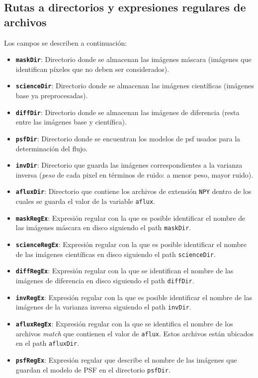 \begin{appendix}
\section{Rutas a directorios y expresiones regulares de archivos}
\label{subs:des_rutas}
Los campos se describen a continuaci\'on:
\begin{itemize}
\item \textbf{\texttt{maskDir}}: Directorio donde se almacenan las im\'agenes m\'ascara (im\'agenes que identifican p\'ixeles que no deben ser considerados).
\item \textbf{\texttt{scienceDir}}: Directorio donde se almacenan las im\'agenes cient\'ificas (im\'agenes base ya preprocesadas).
\item \textbf{\texttt{diffDir}}: Directorio donde se almacenan las im\'agenes de diferencia (resta entre las im\'agenes base y cient\'ifica).
\item \textbf{\texttt{psfDir}}: Directorio donde se encuentran los modelos de psf usados para la determinaci\'on del flujo.
\item \textbf{\texttt{invDir}}: Directorio que guarda las im\'agenes correspondientes a la varianza inversa (\textit{peso} de cada pixel en t\'erminos de ruido: a menor peso, mayor ruido).
\item \textbf{\texttt{afluxDir}}: Directorio que contiene los archivos de extensi\'on \texttt{NPY} dentro de los cuales se guarda el valor de la variable \texttt{aflux}.
\item \textbf{\texttt{maskRegEx}}: Expresi\'on regular con la que es posible identificar el nombre de las im\'agenes m\'ascara en disco siguiendo el path \texttt{maskDir}.
\item \textbf{\texttt{scienceRegEx}}: Expresi\'on regular con la que es posible identificar el nombre de las im\'agenes cient\'ificas en disco siguiendo el path \texttt{scienceDir}.
\item \textbf{\texttt{diffRegEx}}: Expresi\'on regular con la que se identifican el nombre de las im\'agenes de diferencia en disco siguiendo el path \texttt{diffDir}.
\item \textbf{\texttt{invRegEx}}: Expresi\'on regular con la que es posible identificar el nombre de las im\'agenes de la varianza inversa siguiendo el path \texttt{invDir}.
\item \textbf{\texttt{afluxRegEx}}: Expresi\'on regular con la que se identifica el nombre de los archivos \textit{match} que contienen el valor de \texttt{aflux}. Estos archivos est\'an ubicados en el path \texttt{afluxDir}.
\item \textbf{\texttt{psfRegEx}}: Expresi\'on regular que describe el nombre de las im\'agenes que guardan el modelo de PSF en el directorio \texttt{psfDir}.
\end{itemize}


\end{appendix}
